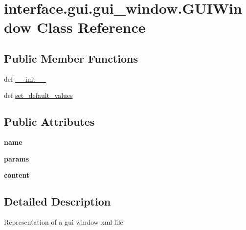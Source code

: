 \hypertarget{classinterface_1_1gui_1_1gui__window_1_1_g_u_i_window}{\section{interface.\-gui.\-gui\-\_\-window.\-G\-U\-I\-Window \-Class \-Reference}
\label{classinterface_1_1gui_1_1gui__window_1_1_g_u_i_window}
}
\subsection*{\-Public \-Member \-Functions}
\begin{DoxyCompactItemize}
\item 
def \hyperlink{classinterface_1_1gui_1_1gui__window_1_1_g_u_i_window_a9bafceb76d8c1b41cc2a46f8ed884845}{\-\_\-\-\_\-init\-\_\-\-\_\-}
\item 
def \hyperlink{classinterface_1_1gui_1_1gui__window_1_1_g_u_i_window_aba0a0a229e6b5fdd6013ac89d72c2d37}{set\-\_\-default\-\_\-values}
\end{DoxyCompactItemize}
\subsection*{\-Public \-Attributes}
\begin{DoxyCompactItemize}
\item 
\hypertarget{classinterface_1_1gui_1_1gui__window_1_1_g_u_i_window_aef31055f946d5338d8d95b9f13583d2a}{{\bfseries name}}\label{classinterface_1_1gui_1_1gui__window_1_1_g_u_i_window_aef31055f946d5338d8d95b9f13583d2a}

\item 
\hypertarget{classinterface_1_1gui_1_1gui__window_1_1_g_u_i_window_a34e29b856e5bfd3712283464857e4981}{{\bfseries params}}\label{classinterface_1_1gui_1_1gui__window_1_1_g_u_i_window_a34e29b856e5bfd3712283464857e4981}

\item 
\hypertarget{classinterface_1_1gui_1_1gui__window_1_1_g_u_i_window_ae87eccc416a1d7aed2c7430e17765ae0}{{\bfseries content}}\label{classinterface_1_1gui_1_1gui__window_1_1_g_u_i_window_ae87eccc416a1d7aed2c7430e17765ae0}

\end{DoxyCompactItemize}


\subsection{\-Detailed \-Description}
\begin{DoxyVerb}Representation of a gui window xml file \end{DoxyVerb}
 

